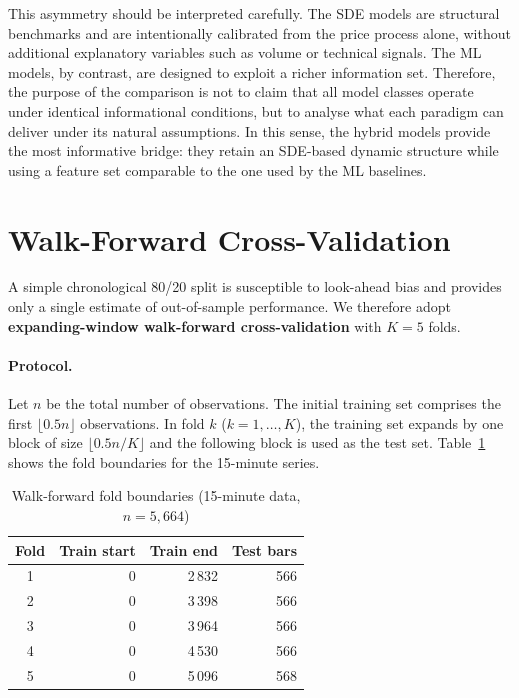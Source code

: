 \documentclass[12pt, a4paper, oneside]{report}
\theoremstyle{plain}
\theoremstyle{definition}
\theoremstyle{remark}
\begin{document}
This asymmetry should be interpreted carefully.  The SDE models are structural
benchmarks and are intentionally calibrated from the price process alone,
without additional explanatory variables such as volume or technical signals.
The ML models, by contrast, are designed to exploit a richer information set.
Therefore, the purpose of the comparison is not to claim that all model classes
operate under identical informational conditions, but to analyse what each
paradigm can deliver under its natural assumptions.  In this sense, the hybrid
models provide the most informative bridge: they retain an SDE-based dynamic
structure while using a feature set comparable to the one used by the ML
baselines.

\section{Walk-Forward Cross-Validation}
\label{sec:wfcv}

A simple chronological 80/20 split is susceptible to look-ahead bias and
provides only a single estimate of out-of-sample performance.  We therefore
adopt \textbf{expanding-window walk-forward cross-validation} with $K = 5$
folds.

\paragraph{Protocol.}
Let $n$ be the total number of observations.  The initial training set
comprises the first $\lfloor 0.5 n \rfloor$ observations.  In fold $k$
($k = 1, \ldots, K$), the training set expands by one block of size
$\lfloor 0.5n / K \rfloor$ and the following block is used as the test set.
Table~\ref{tab:wf_splits} shows the fold boundaries for the 15-minute series.

\begin{table}[H]
\begin{singlespace}
\fontsize{10}{11}\selectfont
\caption{Walk-forward fold boundaries (15-minute data, $n = 5{,}664$)}
\label{tab:wf_splits}
\begin{tabular}{@{}crrr@{}}
\toprule
Fold & Train start & Train end & Test bars \\
\midrule
1 & 0    & 2\,832 & 566 \\
2 & 0    & 3\,398 & 566 \\
3 & 0    & 3\,964 & 566 \\
4 & 0    & 4\,530 & 566 \\
5 & 0    & 5\,096 & 568 \\
\bottomrule
\end{tabular}
\end{singlespace}
\end{table}
\end{document}
